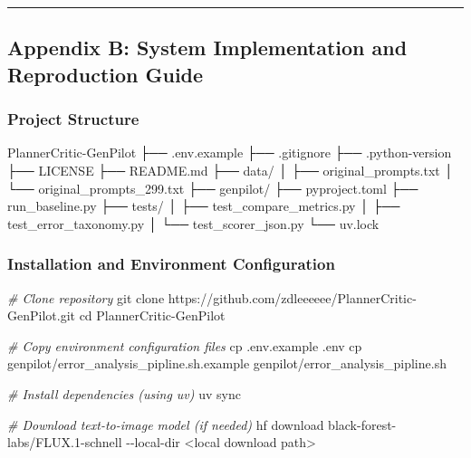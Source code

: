 \documentclass[
]{article}
\newenvironment{Shaded}{}{}
\newcommand{\AttributeTok}[1]{\textcolor[rgb]{0.49,0.56,0.16}{#1}}
\newcommand{\BuiltInTok}[1]{\textcolor[rgb]{0.00,0.50,0.00}{#1}}
\newcommand{\CommentTok}[1]{\textcolor[rgb]{0.38,0.63,0.69}{\textit{#1}}}
\newcommand{\ExtensionTok}[1]{#1}
\newcommand{\FunctionTok}[1]{\textcolor[rgb]{0.02,0.16,0.49}{#1}}
\newcommand{\NormalTok}[1]{#1}
\newcommand{\OperatorTok}[1]{\textcolor[rgb]{0.40,0.40,0.40}{#1}}
\begin{document}
\begin{center}\rule{0.5\linewidth}{0.5pt}\end{center}

\subsection{Appendix B: System Implementation and Reproduction
Guide}\label{appendix-b-system-implementation-and-reproduction-guide}

\subsubsection{Project Structure}\label{project-structure}

\begin{Shaded}
\begin{Highlighting}[]
\NormalTok{PlannerCritic{-}GenPilot}
\NormalTok{├── .env.example}
\NormalTok{├── .gitignore}
\NormalTok{├── .python{-}version}
\NormalTok{├── LICENSE}
\NormalTok{├── README.md}
\NormalTok{├── data/}
\NormalTok{│   ├── original\_prompts.txt}
\NormalTok{│   └── original\_prompts\_299.txt}
\NormalTok{├── genpilot/}
\NormalTok{├── pyproject.toml}
\NormalTok{├── run\_baseline.py}
\NormalTok{├── tests/}
\NormalTok{│   ├── test\_compare\_metrics.py}
\NormalTok{│   ├── test\_error\_taxonomy.py}
\NormalTok{│   └── test\_scorer\_json.py}
\NormalTok{└── uv.lock}
\end{Highlighting}
\end{Shaded}

\subsubsection{Installation and Environment
Configuration}\label{installation-and-environment-configuration}

\begin{Shaded}
\begin{Highlighting}[]
\CommentTok{\# Clone repository}
\FunctionTok{git}\NormalTok{ clone https://github.com/zdleeeeee/PlannerCritic{-}GenPilot.git}
\BuiltInTok{cd}\NormalTok{ PlannerCritic{-}GenPilot}

\CommentTok{\# Copy environment configuration files}
\FunctionTok{cp}\NormalTok{ .env.example .env}
\FunctionTok{cp}\NormalTok{ genpilot/error\_analysis\_pipline.sh.example genpilot/error\_analysis\_pipline.sh}

\CommentTok{\# Install dependencies (using uv)}
\ExtensionTok{uv}\NormalTok{ sync}

\CommentTok{\# Download text{-}to{-}image model (if needed)}
\ExtensionTok{hf}\NormalTok{ download black{-}forest{-}labs/FLUX.1{-}schnell }\AttributeTok{{-}{-}local{-}dir} \OperatorTok{\textless{}}\NormalTok{local download path}\OperatorTok{\textgreater{}}
\end{Highlighting}
\end{Shaded}
\end{document}
